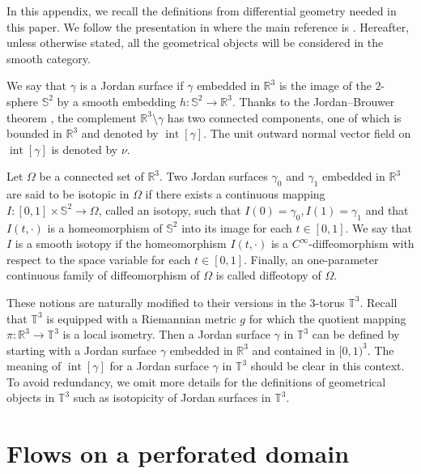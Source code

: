 \documentclass[11pt,a4paper]{article}
\numberwithin{equation}{section}
\newcommand{\R}{\mathbb{R}}
\renewcommand{\S}{\mathbb{S}}
\newcommand{\T}{\mathbb{T}}
\newcommand{\opint}{\operatorname{int}}
\begin{document}
In this appendix, we recall the definitions from differential geometry needed in this paper. We follow the presentation in \cite[Section 1.2]{GlaHor12} where the main reference is \cite{Hir76book}. Hereafter, unless otherwise stated, all the geometrical objects will be considered in the smooth category. 


We say that $\gamma$ is a Jordan surface if $\gamma$ embedded in $\R^3$ is the image of the $2$-sphere $\S^2$ by a smooth embedding $h: \S^2 \rightarrow \R^3$. Thanks to the Jordan–Brouwer theorem \cite{Bro11,GuiPol74}, the complement $\R^3\setminus \gamma$ has two connected components, one of which is bounded in $\R^3$ and denoted by $\opint[\gamma]$. The unit outward normal vector field on $\opint[\gamma]$ is denoted by $\nu$. 


Let $\Omega$ be a connected set of $\R^3$. Two Jordan surfaces $\gamma_0$ and $\gamma_1$ embedded in $\R^3$ are said to be isotopic in $\Omega$ if there exists a continuous mapping $I: [0,1]\times \S^2 \rightarrow \Omega$, called an isotopy, such that $I(0)=\gamma_0, I(1)=\gamma_1$ and that $I(t,\cdot)$ is a homeomorphism of $\S^2$ into its image for each $t\in[0,1]$. We say that $I$ is a smooth isotopy if the homeomorphism $I(t,\cdot)$ is a $C^\infty$-diffeomorphism with respect to the space variable for each $t\in[0,1]$. Finally, an one-parameter continuous family of diffeomorphism of $\Omega$ is called diffeotopy of $\Omega$. 


These notions are naturally modified to their versions in the $3$-torus $\T^3$. Recall that $\T^3$ is equipped with a Riemannian metric $g$ for which the quotient mapping $\pi: \R^3 \to \T^3$ is a local isometry. Then a Jordan surface $\gamma$ in $\T^3$ can be defined by starting with a Jordan surface $\gamma$ embedded in $\R^3$ and contained in $[0,1)^3$. The meaning of $\opint[\gamma]$ for a Jordan surface $\gamma$ in $\T^3$ should be clear in this context. To avoid redundancy, we omit more details for the definitions of geometrical objects in $\T^3$ such as isotopicity of Jordan surfaces in $\T^3$.


    \section{Flows on a perforated domain}
    \label{appx.Flow}
\end{document}
